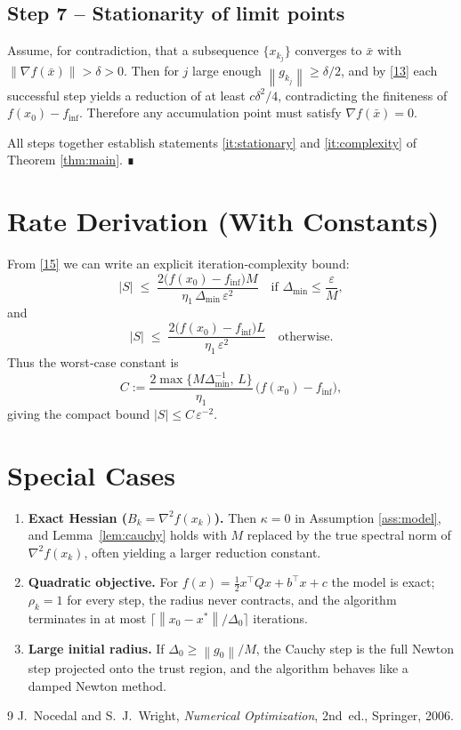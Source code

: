 \documentclass{article}
\newcommand{\norm}[1]{\left\lVert#1\right\rVert}
\begin{document}
\subsection*{Step 7 – Stationarity of limit points}
Assume, for contradiction, that a subsequence $\{x_{k_{j}}\}$ converges to $\bar x$ with $\norm{\nabla f(\bar x)}>\delta>0$. Then for $j$ large enough $\norm{g_{k_{j}}}\ge\delta/2$, and by \eqref{13} each successful step yields a reduction of at least $c\delta^{2}/4$, contradicting the finiteness of $f(x_{0})-f_{\inf}$. Therefore any accumulation point must satisfy $\nabla f(\bar x)=0$.

All steps together establish statements \eqref{it:stationary} and \eqref{it:complexity} of Theorem \ref{thm:main}. ∎

\section*{Rate Derivation (With Constants)}
From \eqref{15} we can write an explicit iteration‑complexity bound:
\[
|S|\;\le\;
\frac{2\bigl(f(x_{0})-f_{\inf}\bigr)M}{\eta_{1}\,\Delta_{\min}\,\varepsilon^{2}}
\quad\text{if }\Delta_{\min}\le\frac{\varepsilon}{M},
\]
and
\[
|S|\;\le\;
\frac{2\bigl(f(x_{0})-f_{\inf}\bigr)L}{\eta_{1}\,\varepsilon^{2}}
\quad\text{otherwise}.
\]
Thus the worst‑case constant is
\[
C:=\frac{2\max\{M\Delta_{\min}^{-1},\,L\}}{\eta_{1}}\,\bigl(f(x_{0})-f_{\inf}\bigr),
\]
giving the compact bound $|S|\le C\,\varepsilon^{-2}$.

\section*{Special Cases}
\begin{enumerate}
\item \textbf{Exact Hessian ($B_{k}= \nabla^{2}f(x_{k})$).} Then $\kappa=0$ in Assumption \ref{ass:model}, and Lemma~\ref{lem:cauchy} holds with $M$ replaced by the true spectral norm of $\nabla^{2}f(x_{k})$, often yielding a larger reduction constant.
\item \textbf{Quadratic objective.} For $f(x)=\tfrac12 x^{\top}Qx+b^{\top}x+c$ the model is exact; $\rho_{k}=1$ for every step, the radius never contracts, and the algorithm terminates in at most $\lceil \norm{x_{0}-x^{*}}/\Delta_{0}\rceil$ iterations.
\item \textbf{Large initial radius.} If $\Delta_{0}\ge \norm{g_{0}}/M$, the Cauchy step is the full Newton step projected onto the trust region, and the algorithm behaves like a damped Newton method.
\end{enumerate}

\begin{thebibliography}{9}
J.~Nocedal and S.~J.~Wright,
\emph{Numerical Optimization},
2nd~ed., Springer, 2006.
\end{thebibliography}
\end{document}
